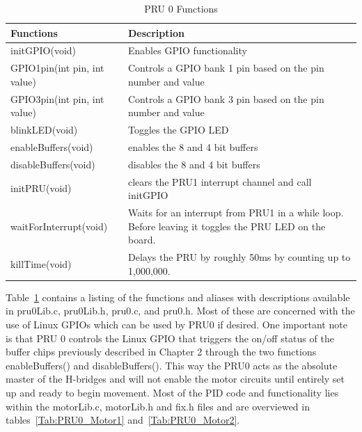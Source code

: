 \documentclass[12pt,oneside,final]{siuethesis}
\theoremstyle{definition}
\begin{document}
\begin{table}

    \begin{tabular}{ | l | p{9cm} |}
    	\hline
	Functions & Description  \\ \hline
	initGPIO(void) & Enables GPIO functionality \\ \hline
	GPIO1pin(int pin, int value) & Controls a GPIO bank 1 pin based on the pin number and value \\ \hline
	GPIO3pin(int pin, int value) & Controls a GPIO bank 3 pin based on the pin number and value \\ \hline
	blinkLED(void) & Toggles the GPIO LED \\ \hline
	enableBuffers(void) & enables the 8 and 4 bit buffers \\ \hline
	disableBuffers(void) & disables the 8 and 4 bit buffers \\ \hline
	initPRU(void) & clears the PRU1 interrupt channel and call initGPIO \\ \hline
	waitForInterrupt(void) & Waits for an interrupt from PRU1 in a while loop. Before leaving it toggles the PRU LED on the board.	 \\ \hline
	killTime(void) & Delays the PRU by roughly 50ms by counting up to 1,000,000. \\ \hline

    \end{tabular}
     \caption{PRU 0 Functions}
 	\label{Tab:PRU0_fun}
\end{table}

Table~\ref{Tab:PRU0_fun} contains a listing of the functions and aliases with descriptions available in pru0Lib.c, pru0Lib.h, pru0.c, and pru0.h. Most of these are concerned with the use of Linux  GPIOs which can be used by PRU0 if desired. One important note is that PRU 0 controls the Linux  GPIO that triggers the on/off status of the buffer chips previously described in Chapter 2 through the two functions enableBuffers() and disableBuffers(). This way the PRU0 acts as the absolute master of the H-bridges and will not enable the motor circuits until entirely set up and ready to begin movement. Most of the PID code and functionality lies within the motorLib.c, motorLib.h and fix.h files and are overviewed in tables~\ref{Tab:PRU0_Motor1} and~\ref{Tab:PRU0_Motor2}.
\end{document}
